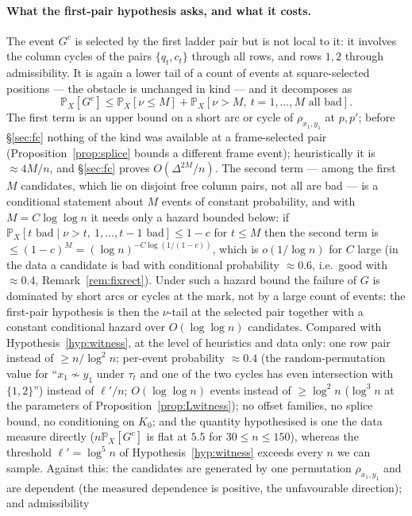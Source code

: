 \documentclass[11pt]{article}
\theoremstyle{definition}
\renewcommand{\Pr}{\mathbb{P}}
\begin{document}
\paragraph{What the first-pair hypothesis asks, and what it costs.}  The event $G^c$ is
selected by the first ladder pair but is not local to it: it involves the column cycles of
the pairs $\{q_t,c_t\}$ through all rows, and rows $1,2$ through admissibility.  It is
again a lower tail of a count of events at square-selected positions --- the obstacle is
unchanged in kind --- and it decomposes as
\[
\Pr_X[G^c]\le\Pr_X[\nu\le M]+\Pr_X[\nu>M,\ t=1,\dots,M\text{ all bad}].
\]
The first term is an upper bound on a short arc or cycle of $\rho_{x_1,y_1}$ at $p,p'$;
before \S\ref{sec:fc} nothing of the kind was available at a frame-selected pair
(Proposition~\ref{prop:splice} bounds a different frame event); heuristically it is
$\approx4M/n$, and \S\ref{sec:fc} proves $O(\Delta^{2M}/n)$.  The second term
--- among the first $M$ candidates, which lie on disjoint free column pairs, not all are bad
--- is a conditional statement about $M$ events of constant probability, and with
$M=C\log\log n$ it needs only a hazard bounded below: if
$\Pr_X[t\text{ bad}\mid\nu>t,\ 1,\dots,t-1\text{ bad}]\le1-c$ for $t\le M$ then the second
term is $\le(1-c)^M=(\log n)^{-C\log(1/(1-c))}$, which is $o(1/\log n)$ for $C$ large (in
the data a candidate is bad with conditional probability $\approx0.6$, i.e.\ good with
$\approx0.4$, Remark~\ref{rem:fixrect}).  Under
such a hazard bound the failure of $G$ is dominated by short arcs or cycles at the mark, not
by a large count of events: the first-pair hypothesis is then the $\nu$-tail at the selected
pair together with a constant conditional hazard over $O(\log\log n)$ candidates.  Compared with
Hypothesis~\ref{hyp:witness}, at the level of heuristics and data only: one row pair instead
of $\ge n/\log^2n$; per-event probability $\approx0.4$ (the random-permutation value for
``$x_1\not\sim y_1$ under $\tau_t$ and one of the two cycles has even intersection with
$\{1,2\}$'') instead of $\ell'/n$; $O(\log\log n)$ events instead of $\ge\log^2n$
($\log^3n$ at the parameters of Proposition~\ref{prop:Lwitness}); no offset families, no
splice bound, no conditioning on $K_0$; and the quantity hypothesised is one the data
measure directly ($n\Pr_X[G^c]$ is flat at $5.5$ for $30\le n\le150$), whereas the threshold
$\ell'=\log^5n$ of Hypothesis~\ref{hyp:witness} exceeds every $n$ we can sample.  Against
this: the candidates are generated by one permutation $\rho_{x_1,y_1}$ and are dependent
(the measured dependence is positive, the unfavourable direction); and admissibility
\end{document}
